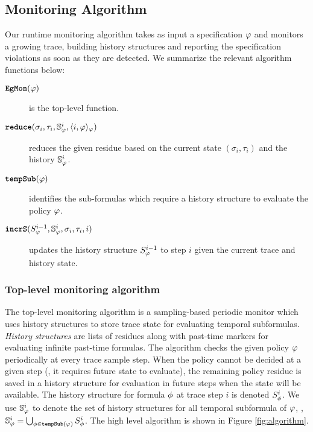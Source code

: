 

\subsection{Monitoring Algorithm}
Our runtime monitoring algorithm \monitor takes as input a specification $\policy$ and monitors a growing trace, building history structures and reporting the specification violations as soon as they are detected. We summarize the relevant algorithm functions below:

\begin{description}
\item[$\monitor{}(\policy)$] is the top-level function. 
\item[$\reduce(\sigma_i, \tau_i, \histSt{i}, \rpt{i}{\policy}{\policy})$] reduces the given residue based on the current state $(\sigma_i,\tau_i)$ and the history $\histSt{i}$.
\item[$\tempSub(\policy)$] identifies the sub-formulas which require a history structure to evaluate the policy $\policy$.
\item[$\incrS(\histst{i-1}, \histSt{i}, \sigma_i, \tau_i, i)$] updates the history structure $\histst{i-1}$ to step $i$ given the current trace and history state.
\end{description}




\subsubsection{Top-level monitoring algorithm}
The top-level monitoring algorithm \monitor is a sampling-based periodic monitor which uses history structures to store trace state for evaluating temporal subformulas. 
\emph{History structures} are lists of residues along with past-time markers for evaluating infinite past-time formulas. 
The algorithm checks the given policy $\policy$ periodically at every trace sample step. 
When the policy cannot be decided at a given step (\eg, it requires future state to evaluate), the remaining policy residue is saved in a history structure for evaluation in future steps when the state will be available. 
The history structure for formula $\policyv$ at trace step $i$ is denoted $\histst[\policyv]{i}$. 
We use $\histSt[\policy]{i}$ to denote the set of history structures for all temporal subformula of $\policy$, \ie, 
$\histSt[\policy]{i} = \bigcup_{\policyv \in \tempSub(\policy)} \histst[\policyv]{i}$.
The high level algorithm \monitor is shown in Figure \ref{fig:algorithm}. 

